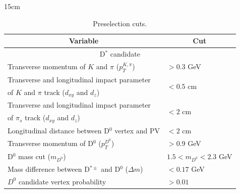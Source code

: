 \begin{table}[!htbp]{15cm}
  \caption{Preselection cuts.}
  \begin{tabular}{ l | l }
    \hline
    \multicolumn{1}{c|}{Variable}                                               & \multicolumn{1}{|c}{Cut}       \\ \hline
    \multicolumn{2}{c}{D$^*$ candidate}                                                                          \\ \hline
    Transverse momentum of $K$ and $\pi$ ($p_T^{K, \pi}$)                       & $> 0.3$ GeV                    \\ \hline
    Transverse and longitudinal impact parameter                                & \multirow[c]{2}{*}{$< 0.5$ cm} \\
    of $K$ and $\pi$ track ($d_{xy}$ and $d_z$)                                 &                                \\ \hline
    Transverse and longitudinal impact parameter                                & \multirow[c]{2}{*}{$< 2$ cm}   \\
    of $\pi_s$ track ($d_{xy}$ and $d_z$)                                       &                                \\ \hline
    Longitudinal distance between D$^0$ vertex and PV                           & $< 2$ cm                       \\ \hline
    Transverse momentum of D$^0$ ($p_T^{D^0}$)                                  & $> 0.9$ GeV                    \\ \hline
    D$^0$ mass cut ($m_{D^0}$)                                    & $1.5 < m_{D^0} < 2.3$ GeV      \\ \hline
    Mass difference between D$^{*\pm}$ and D$^0$ ($\Delta m$)                   & $< 0.17$ GeV                   \\ \hline
    $D^0$ candidate vertex probability                                          & $> 0.01$                       \\ \hline


\end{tabular}
\end{table}
